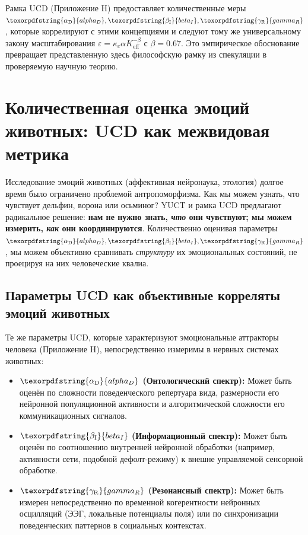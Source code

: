 \documentclass[12pt,a4paper]{article}
\DeclareRobustCommand{\alD}{\texorpdfstring{\ensuremath{\alpha_{\mathrm{D}}}}{alpha_D}}
\DeclareRobustCommand{\beI}{\texorpdfstring{\ensuremath{\beta_{\mathrm{I}}}}{beta_I}}
\DeclareRobustCommand{\gaR}{\texorpdfstring{\ensuremath{\gamma_{\mathrm{R}}}}{gamma_R}}
\newcommand{\eff}{\mathrm{eff}}
\newcommand{\Ke}{K_{\eff}}
\begin{document}
	Рамка UCD (Приложение H) предоставляет количественные меры \(\alD, \beI, \gaR\), которые коррелируют с этими концепциями и следуют тому же универсальному закону масштабирования \(\varepsilon = \kappa_c \alpha \Ke^{-\beta}\) с \(\beta = 0.67\). Это эмпирическое обоснование превращает представленную здесь философскую рамку из спекуляции в проверяемую научную теорию.
	
	\section{Количественная оценка эмоций животных: UCD как межвидовая метрика}
	
	Исследование эмоций животных (аффективная нейронаука, этология) долгое время было ограничено проблемой антропоморфизма. Как мы можем узнать, что чувствует дельфин, ворона или осьминог? YUCT и рамка UCD предлагают радикальное решение: \textbf{нам не нужно знать, \textit{что} они чувствуют; мы можем измерить, \textit{как} они координируются}. Количественно оценивая параметры \(\alD, \beI, \gaR\), мы можем объективно сравнивать \textit{структуру} их эмоциональных состояний, не проецируя на них человеческие квалиа.
	
	\subsection{Параметры UCD как объективные корреляты эмоций животных}
	
	Те же параметры UCD, которые характеризуют эмоциональные аттракторы человека (Приложение H), непосредственно измеримы в нервных системах животных:
	
	\begin{itemize}
		\item \textbf{\(\alD\) (Онтологический спектр):} Может быть оценён по сложности поведенческого репертуара вида, размерности его нейронной популяционной активности и алгоритмической сложности его коммуникационных сигналов.
		\item \textbf{\(\beI\) (Информационный спектр):} Может быть оценён по соотношению внутренней нейронной обработки (например, активности сети, подобной дефолт-режиму) к внешне управляемой сенсорной обработке.
		\item \textbf{\(\gaR\) (Резонансный спектр):} Может быть измерен непосредственно по временной когерентности нейронных осцилляций (ЭЭГ, локальные потенциалы поля) или по синхронизации поведенческих паттернов в социальных контекстах.
	\end{itemize}
	
\end{document}
